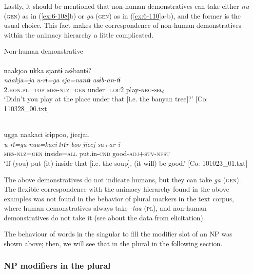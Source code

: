   Lastly, it should be mentioned that non-human demonstratives can take either \textit{nu} (\textsc{gen}) as in (\ref{ex:6-108}b) or \textit{ga} (\textsc{gen}) as in (\ref{ex:6-110}a-b), and the former is the usual choice. This fact makes the correspondence of non-human demonstratives within the animacy hierarchy a little complicated.

\ea\label{ex:6-110}
  Non-human demonstrative\\

 \ea{}\\
{\TM}
\glll  naakjoo  ukka  sjantɨ  asɨbantɨ?\\
\textit{naakja=ja}  \textit{u-rɨ=ga}  \textit{sja=nantɨ}  \textit{asɨb-an-tɨ}\\
2.\textsc{hon}.\textsc{pl}=\textsc{top}  \textsc{mes}-\textsc{nlz}=\textsc{gen}  under=\textsc{loc2}  play-\textsc{neg}-\textsc{seq}\\
\glt ‘Didn’t you play at the place under that [i.e. the banyan tree]?’ [Co: 110328\_00.txt]

\ex{}\\
{\TM}
\glll  ugga  naakaci  ɨrɨppoo,  jiccjai.\\
\textit{u-rɨ=ga}  \textit{naa=kaci}  \textit{ɨrɨr-boo}  \textit{jiccj-sa+ar-i}\\
\textsc{mes}-\textsc{nlz}=\textsc{gen}  inside=\textsc{all}  put.in-\textsc{cnd}  good-\textsc{adj}+\textsc{stv}-\textsc{npst}\\
\glt ‘If (you) put (it) inside that [i.e. the soup], (it will) be good.’ [Co: 101023\_01.txt]
\z
\z

The above demonstratives do not indicate humans, but they can take \textit{ga} (\textsc{gen}). The flexible correspondence with the animacy hierarchy found in the above examples was not found in the behavior of plural markers in the text corpus, where human demonstratives always take \textit{-taa} (\textsc{pl}), and non-human demonstratives do not take it (see  about the data from elicitation).

  The behaviour of words in the singular to fill the modifier slot of an NP was shown above; then, we will see that in the plural in the following section.

\subsubsection{NP modifiers in the plural}

